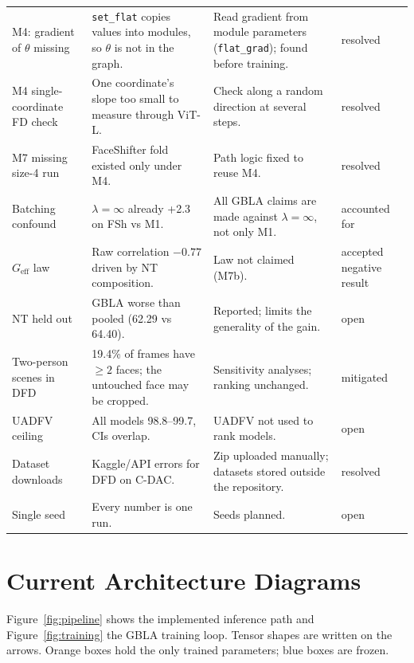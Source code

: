 \documentclass[10pt,a4paper]{article}
\begin{document}
\begin{table}[H]
\begin{tabularx}{\linewidth}{@{}L{2.6cm}YYL{1.5cm}@{}}
M4: gradient of \(\theta\) missing & \texttt{set\_flat} copies values into modules, so \(\theta\) is not in the graph. & Read gradient from module parameters (\texttt{flat\_grad}); found before training. & resolved\\
M4 single-coordinate FD check & One coordinate's slope too small to measure through ViT-L. & Check along a random direction at several steps. & resolved\\
M7 missing size-4 run & FaceShifter fold existed only under M4. & Path logic fixed to reuse M4. & resolved\\
Batching confound & \(\lambda=\infty\) already +2.3 on FSh vs M1. & All GBLA claims are made against \(\lambda=\infty\), not only M1. & accounted for\\
\(G_\text{eff}\) law & Raw correlation \(-0.77\) driven by NT composition. & Law not claimed (M7b). & accepted negative result\\
NT held out & GBLA worse than pooled (62.29 vs 64.40). & Reported; limits the generality of the gain. & open\\
Two-person scenes in DFD & 19.4\% of frames have \(\ge2\) faces; the untouched face may be cropped. & Sensitivity analyses; ranking unchanged. & mitigated\\
UADFV ceiling & All models 98.8--99.7, CIs overlap. & UADFV not used to rank models. & open\\
Dataset downloads & Kaggle/API errors for DFD on C-DAC. & Zip uploaded manually; datasets stored outside the repository. & resolved\\
Single seed & Every number is one run. & Seeds planned. & open\\
\bottomrule
\end{tabularx}
\end{table}

\section{Current Architecture Diagrams}\label{sec:diagrams}
Figure~\ref{fig:pipeline} shows the implemented inference path and Figure~\ref{fig:training} the
GBLA training loop. Tensor shapes are written on the arrows. Orange boxes hold the only trained
parameters; blue boxes are frozen.
\end{document}
